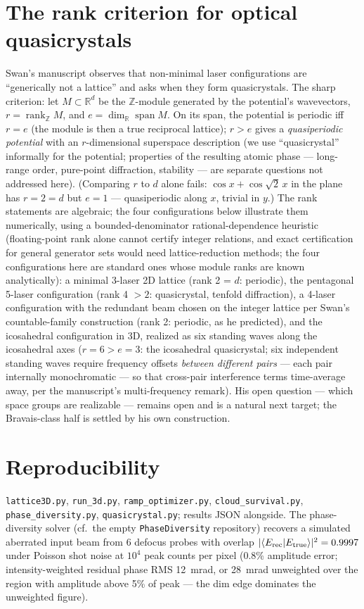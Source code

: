 \documentclass[aps,prb,floatfix,amsmath,amssymb,groupedaddress]{revtex4}
\begin{document}
\section{The rank criterion for optical quasicrystals}

Swan's manuscript observes that non-minimal laser configurations are
``generically not a lattice'' and asks when they form quasicrystals. The
sharp criterion: let $M \subset \mathbb{R}^d$ be the $\mathbb{Z}$-module
generated by the potential's wavevectors,
$r = \operatorname{rank}_{\mathbb Z} M$, and
$e = \dim_{\mathbb R} \operatorname{span} M$. On its span, the potential is
periodic iff $r = e$ (the module is then a true reciprocal lattice); $r > e$
gives a \emph{quasiperiodic potential} with an $r$-dimensional superspace
description (we use ``quasicrystal'' informally for the potential; properties
of the resulting atomic phase --- long-range order, pure-point diffraction,
stability --- are separate questions not addressed here).
(Comparing $r$ to $d$ alone fails: $\cos x + \cos\sqrt2\,x$ in the plane has
$r = 2 = d$ but $e = 1$ --- quasiperiodic along $x$, trivial in $y$.) The rank
statements are algebraic; the four configurations below illustrate them
numerically, using a bounded-denominator rational-dependence heuristic
(floating-point rank alone cannot certify integer relations, and exact
certification for general generator sets would need lattice-reduction
methods; the four configurations here are standard ones whose module ranks
are known analytically): a minimal
3-laser 2D lattice (rank 2 = $d$:
periodic), the pentagonal 5-laser configuration (rank 4 $> 2$: quasicrystal,
tenfold diffraction), a 4-laser configuration with the redundant beam chosen
on the integer lattice per Swan's countable-family construction (rank 2:
periodic, as he predicted), and the icosahedral configuration in 3D, realized as six standing waves
along the icosahedral axes ($r = 6 > e = 3$: the icosahedral quasicrystal;
six independent standing waves require frequency offsets \emph{between
different pairs} --- each pair internally monochromatic --- so that
cross-pair interference terms time-average away, per the manuscript's
multi-frequency remark). His open question --- which
space groups are realizable --- remains open and is a natural next target;
the Bravais-class half is settled by his own construction.

\section*{Reproducibility}

\texttt{lattice3D.py}, \texttt{run\_3d.py}, \texttt{ramp\_optimizer.py},
\texttt{cloud\_survival.py}, \texttt{phase\_diversity.py},
\texttt{quasicrystal.py}; results JSON alongside. The phase-diversity solver
(cf.\ the empty \texttt{PhaseDiversity} repository) recovers a simulated
aberrated input beam from 6 defocus probes with overlap
$|\langle E_{\rm rec}|E_{\rm true}\rangle|^2 = 0.9997$ under Poisson shot
noise at $10^4$ peak counts per pixel (0.8\% amplitude error;
intensity-weighted residual phase RMS 12~mrad, or 28~mrad unweighted over
the region with amplitude above 5\% of peak --- the dim edge dominates the
unweighted figure).
\end{document}
